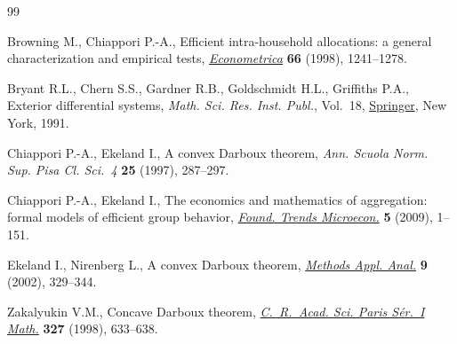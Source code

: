 \documentclass[pdftex]{sigma}
\numberwithin{equation}{section}
\begin{document}
\begin{thebibliography}{99}
\footnotesize\itemsep=0pt

Browning M., Chiappori P.-A., Efficient intra-household allocations: a general
 characterization and empirical tests, \href{https://doi.org/10.2307/2999616}{\textit{Econometrica}} \textbf{66}
 (1998), 1241--1278.

Bryant R.L., Chern S.S., Gardner R.B., Goldschmidt H.L., Griffiths P.A.,
 Exterior differential systems, \textit{Math. Sci. Res. Inst. Publ.}, Vol.~18,
 \href{https://doi.org/10.1007/978-1-4613-9714-4}{Springer}, New York, 1991.

Chiappori P.-A., Ekeland I., A convex {D}arboux theorem, \textit{Ann. Scuola
 Norm. Sup. Pisa Cl. Sci.~4} \textbf{25} (1997), 287--297.

Chiappori P.-A., Ekeland I., The economics and mathematics of aggregation:
 formal models of efficient group behavior, \href{https://doi.org/10.1561/0700000028}{\textit{Found. Trends Microecon.}}
 \textbf{5} (2009), 1--151.

Ekeland I., Nirenberg L., A convex {D}arboux theorem, \href{https://doi.org/10.4310/MAA.2002.v9.n3.a3}{\textit{Methods Appl. Anal.}} \textbf{9} (2002), 329--344.

Zakalyukin V.M., Concave {D}arboux theorem, \href{https://doi.org/10.1016/S0764-4442(99)80092-5}{\textit{C.~R.~Acad. Sci. Paris
 S\'{e}r.~{I} Math.}} \textbf{327} (1998), 633--638.

\end{thebibliography}\LastPageEnding
\end{document}
